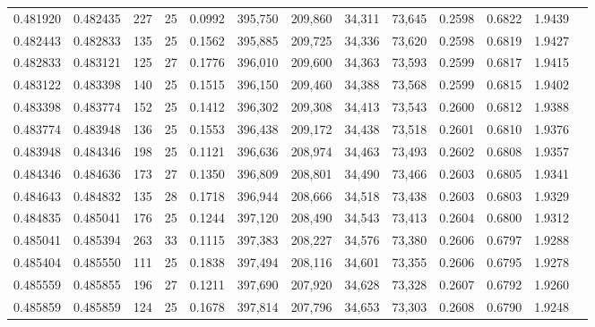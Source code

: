 \begin{tabular}{rrrrrrrrrrrrr}
0.481920 & 0.482435 &   227 &  25 &                                     0.0992 & 395,750 & 209,860 &  34,311 &  73,645 & 0.2598 & 0.6822 & 1.9439 \\
0.482443 & 0.482833 &   135 &  25 &                                     0.1562 & 395,885 & 209,725 &  34,336 &  73,620 & 0.2598 & 0.6819 & 1.9427 \\
0.482833 & 0.483121 &   125 &  27 &                                     0.1776 & 396,010 & 209,600 &  34,363 &  73,593 & 0.2599 & 0.6817 & 1.9415 \\
0.483122 & 0.483398 &   140 &  25 &                                     0.1515 & 396,150 & 209,460 &  34,388 &  73,568 & 0.2599 & 0.6815 & 1.9402 \\
0.483398 & 0.483774 &   152 &  25 &                                     0.1412 & 396,302 & 209,308 &  34,413 &  73,543 & 0.2600 & 0.6812 & 1.9388 \\
0.483774 & 0.483948 &   136 &  25 &                                     0.1553 & 396,438 & 209,172 &  34,438 &  73,518 & 0.2601 & 0.6810 & 1.9376 \\
0.483948 & 0.484346 &   198 &  25 &                                     0.1121 & 396,636 & 208,974 &  34,463 &  73,493 & 0.2602 & 0.6808 & 1.9357 \\
0.484346 & 0.484636 &   173 &  27 &                                     0.1350 & 396,809 & 208,801 &  34,490 &  73,466 & 0.2603 & 0.6805 & 1.9341 \\
0.484643 & 0.484832 &   135 &  28 &                                     0.1718 & 396,944 & 208,666 &  34,518 &  73,438 & 0.2603 & 0.6803 & 1.9329 \\
0.484835 & 0.485041 &   176 &  25 &                                     0.1244 & 397,120 & 208,490 &  34,543 &  73,413 & 0.2604 & 0.6800 & 1.9312 \\
0.485041 & 0.485394 &   263 &  33 &                                     0.1115 & 397,383 & 208,227 &  34,576 &  73,380 & 0.2606 & 0.6797 & 1.9288 \\
0.485404 & 0.485550 &   111 &  25 &                                     0.1838 & 397,494 & 208,116 &  34,601 &  73,355 & 0.2606 & 0.6795 & 1.9278 \\
0.485559 & 0.485855 &   196 &  27 &                                     0.1211 & 397,690 & 207,920 &  34,628 &  73,328 & 0.2607 & 0.6792 & 1.9260 \\
0.485859 & 0.485859 &   124 &  25 &                                     0.1678 & 397,814 & 207,796 &  34,653 &  73,303 & 0.2608 & 0.6790 & 1.9248 \\

\end{tabular}
